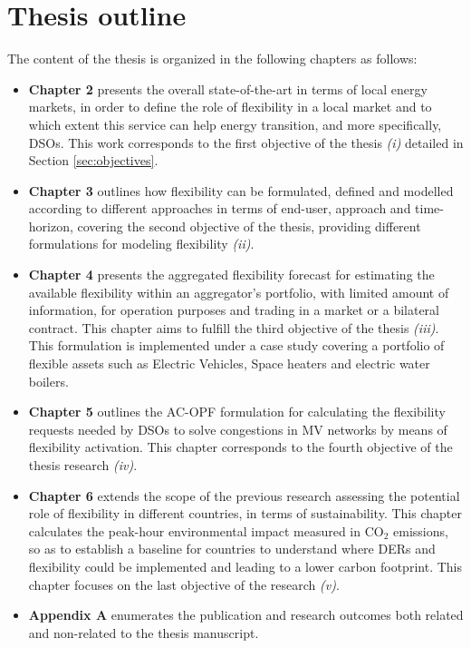 \section{Thesis outline}\label{sec:thesisoutline}
The content of the thesis is organized in the following chapters as follows:
\begin{itemize}
\item \textbf{Chapter 2} presents the overall state-of-the-art in terms of local energy markets, in order to define the role of flexibility in a local market and to which extent this service can help energy transition, and more specifically, DSOs. This work corresponds to the first objective of the thesis \textit{(i)} detailed in Section \ref{sec:objectives}. 
\item \textbf{Chapter 3} outlines how flexibility can be formulated, defined and modelled according to different approaches in terms of end-user, approach and time-horizon, covering the second objective of the thesis, providing different formulations for modeling flexibility \textit{(ii)}. 
\item \textbf{Chapter 4} presents the aggregated flexibility forecast for estimating the available flexibility within an aggregator's portfolio, with limited amount of information, for operation purposes and trading in a market or a bilateral contract. This chapter aims to fulfill the third objective of the thesis \textit{(iii)}. This formulation is implemented under a case study covering a portfolio of flexible assets such as Electric Vehicles, Space heaters and electric water boilers.  
\item \textbf{Chapter 5} outlines the AC-OPF formulation for calculating the flexibility requests needed by DSOs to solve congestions in MV networks by means of flexibility activation. This chapter corresponds to the fourth objective of the thesis research \textit{(iv)}.  
\item \textbf{Chapter 6} extends the scope of the previous research assessing the potential role of flexibility in different countries, in terms of sustainability. This chapter calculates the peak-hour environmental impact measured in CO$_2$ emissions, so as to establish a baseline for countries to understand where DERs and flexibility could be implemented and leading to a lower carbon footprint. This chapter focuses on the last objective of the research \textit{(v)}. 
\item \textbf{Appendix A} enumerates the publication and research outcomes both related and non-related to the thesis manuscript. 
\end{itemize}


